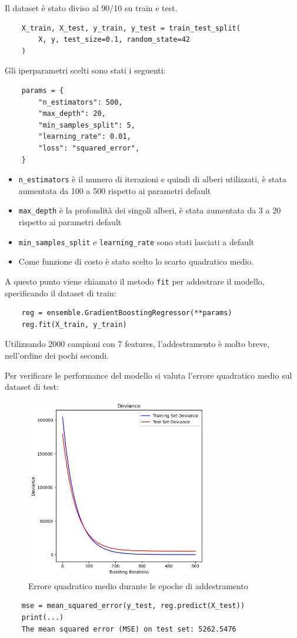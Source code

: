 \documentclass[12pt,a4paper,openright,twoside]{report}
\begin{document}
Il dataset è stato diviso al 90/10 su train e test.
\begin{verbatim}
    X_train, X_test, y_train, y_test = train_test_split(
        X, y, test_size=0.1, random_state=42
    )  
\end{verbatim}
Gli iperparametri scelti sono stati i seguenti:
\begin{verbatim}
    params = {
        "n_estimators": 500,
        "max_depth": 20,
        "min_samples_split": 5,
        "learning_rate": 0.01,
        "loss": "squared_error",
    }
\end{verbatim}
\begin{itemize}
    \item 	\texttt{n\_estimators} è il numero di iterazioni e quindi di alberi utilizzati, è stata aumentata da 100 a 500 rispetto ai parametri default 
    \item \texttt{max\_depth} è la profondità dei singoli alberi, è stata aumentata da 3 a 20 rispetto ai parametri default 
    \item \texttt{min\_samples\_split} e \texttt{learning\_rate} sono stati lasciati a default
    \item Come funzione di costo è stato scelto lo scarto quadratico medio.
\end{itemize}

A questo punto viene chiamato il metodo \texttt{fit} per addestrare il modello, specificando il dataset di train: 
\begin{verbatim}
    reg = ensemble.GradientBoostingRegressor(**params)
    reg.fit(X_train, y_train)    
\end{verbatim}
Utilizzando 2000 campioni con 7 features, l’addestramento è molto breve, nell’ordine dei pochi secondi. 

Per verificare le performance del modello si valuta l'errore quadratico medio sul dataset di test: 
\begin{center}
\begin{figure}[h]
\centering
\includegraphics[width=300px,keepaspectratio]{deviance.png}
\caption{Errore quadratico medio durante le epoche di addestramento   }
\end{figure}    
\end{center}
\begin{verbatim}
    mse = mean_squared_error(y_test, reg.predict(X_test))
    print(...)
    The mean squared error (MSE) on test set: 5262.5476
\end{verbatim}
\end{document}
